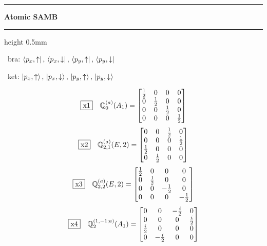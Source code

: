 \documentclass[fleqn,10pt,landscape]{jsarticle}
\begin{document}
\vspace{5mm}
\noindent \rule[0.5mm]{5mm}{0.5mm}\hspace{3mm}\textbf{Atomic SAMB}\hspace{3mm}\leaders\hrule height 0.5mm\hfill\kern0pt
\vspace{3mm}

\vspace{5mm}

\noindent\textbullet\, bra: $\bra{p_{x},\uparrow},\, \bra{p_{x},\downarrow},\, \bra{p_{y},\uparrow},\, \bra{p_{y},\downarrow}$

\noindent\textbullet\, ket: $\ket{p_{x},\uparrow},\, \ket{p_{x},\downarrow},\, \ket{p_{y},\uparrow},\, \ket{p_{y},\downarrow}$

\begin{dmath*}
\fbox{x1}\quad \mathbb{Q}_{0}^{(a)}(A_{1})=\begin{bmatrix} \frac{1}{2} & 0 & 0 & 0 \\ 0 & \frac{1}{2} & 0 & 0 \\ 0 & 0 & \frac{1}{2} & 0 \\ 0 & 0 & 0 & \frac{1}{2} \end{bmatrix}
\end{dmath*}
\begin{dmath*}
\fbox{x2}\quad \mathbb{Q}_{2,1}^{(a)}(E,2)=\begin{bmatrix} 0 & 0 & \frac{1}{2} & 0 \\ 0 & 0 & 0 & \frac{1}{2} \\ \frac{1}{2} & 0 & 0 & 0 \\ 0 & \frac{1}{2} & 0 & 0 \end{bmatrix}
\end{dmath*}
\begin{dmath*}
\fbox{x3}\quad \mathbb{Q}_{2,2}^{(a)}(E,2)=\begin{bmatrix} \frac{1}{2} & 0 & 0 & 0 \\ 0 & \frac{1}{2} & 0 & 0 \\ 0 & 0 & - \frac{1}{2} & 0 \\ 0 & 0 & 0 & - \frac{1}{2} \end{bmatrix}
\end{dmath*}
\begin{dmath*}
\fbox{x4}\quad \mathbb{Q}_{2}^{(1,-1;a)}(A_{1})=\begin{bmatrix} 0 & 0 & - \frac{i}{2} & 0 \\ 0 & 0 & 0 & \frac{i}{2} \\ \frac{i}{2} & 0 & 0 & 0 \\ 0 & - \frac{i}{2} & 0 & 0 \end{bmatrix}
\end{dmath*}
\end{document}
